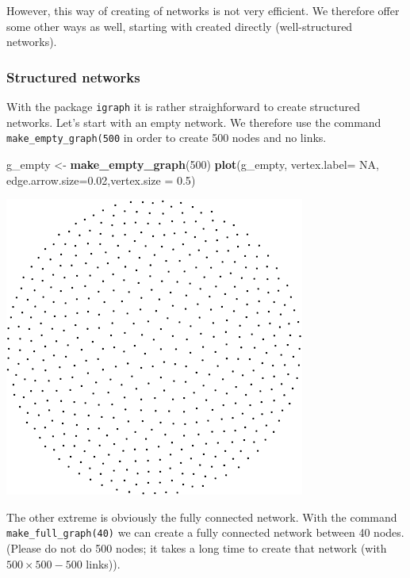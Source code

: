 \documentclass[]{article}
\newenvironment{Shaded}{\begin{snugshade}}{\end{snugshade}}
\newcommand{\KeywordTok}[1]{\textcolor[rgb]{0.13,0.29,0.53}{\textbf{#1}}}
\newcommand{\DataTypeTok}[1]{\textcolor[rgb]{0.13,0.29,0.53}{#1}}
\newcommand{\DecValTok}[1]{\textcolor[rgb]{0.00,0.00,0.81}{#1}}
\newcommand{\FloatTok}[1]{\textcolor[rgb]{0.00,0.00,0.81}{#1}}
\newcommand{\StringTok}[1]{\textcolor[rgb]{0.31,0.60,0.02}{#1}}
\newcommand{\OtherTok}[1]{\textcolor[rgb]{0.56,0.35,0.01}{#1}}
\newcommand{\NormalTok}[1]{#1}
\theoremstyle{definition}
\theoremstyle{definition}
\theoremstyle{definition}
\theoremstyle{remark}
\begin{document}
However, this way of creating of networks is not very efficient. We
therefore offer some other ways as well, starting with created directly
(well-structured networks).

\subsubsection{Structured networks}\label{structured-networks}

With the package \texttt{igraph} it is rather straighforward to create
structured networks. Let's start with an empty network. We therefore use
the command \texttt{make\_empty\_graph(500} in order to create 500 nodes
and no links.

\begin{Shaded}
\begin{Highlighting}[]
\NormalTok{g_empty <-}\StringTok{ }\KeywordTok{make_empty_graph}\NormalTok{(}\DecValTok{500}\NormalTok{)}
\KeywordTok{plot}\NormalTok{(g_empty, }\DataTypeTok{vertex.label=} \OtherTok{NA}\NormalTok{, }\DataTypeTok{edge.arrow.size=}\FloatTok{0.02}\NormalTok{,}\DataTypeTok{vertex.size =} \FloatTok{0.5}\NormalTok{)}
\end{Highlighting}
\end{Shaded}

\includegraphics{ResearchTools_files/figure-latex/unnamed-chunk-49-1.pdf}

The other extreme is obviously the fully connected network. With the
command \texttt{make\_full\_graph(40)} we can create a fully connected
network between 40 nodes. (Please do not do 500 nodes; it takes a long
time to create that network (with \(500 \times 500 - 500\) links)).
\end{document}

